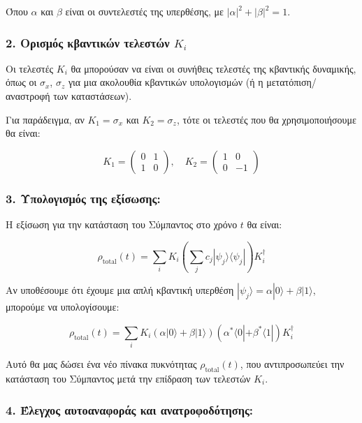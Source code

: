 \documentclass[a4paper,11pt]{article}
\begin{document}
Όπου {{\(\alpha\)}} και {{\(\beta\)}} είναι οι συντελεστές της
υπερθέσης, με {{\(|\alpha|^2 + |\beta|^2 = 1\)}}.

\subsubsection{2. Ορισμός κβαντικών τελεστών \( K_i \)}\label{ορισμός-κβαντικών-τελεστών-k_i}


Οι τελεστές {{\(K_i\)}} θα μπορούσαν να είναι οι συνήθεις τελεστές της
κβαντικής δυναμικής, όπως οι {{\(\sigma_x\)}}, {{\(\sigma_z\)}} για μια
ακολουθία κβαντικών υπολογισμών (ή η μετατόπιση/αναστροφή των
καταστάσεων).

Για παράδειγμα, αν {{\(K_1 = \sigma_x\)}} και {{\(K_2 = \sigma_z\)}},
τότε οι τελεστές που θα χρησιμοποιήσουμε θα είναι:

{{{\[K_1 = \begin{pmatrix} 0 & 1 \\ 1 & 0 \end{pmatrix}, \quad K_2 = \begin{pmatrix} 1 & 0 \\ 0 & -1 \end{pmatrix}\]}}}

\subsubsection{3. Υπολογισμός της
εξίσωσης:}\label{ux3c5ux3c0ux3bfux3bbux3bfux3b3ux3b9ux3c3ux3bcux3ccux3c2-ux3c4ux3b7ux3c2-ux3b5ux3beux3afux3c3ux3c9ux3c3ux3b7ux3c2}

Η εξίσωση για την κατάσταση του Σύμπαντος στο χρόνο {{\(t\)}} θα είναι:

{{{\[\rho_{\text{total}}(t) = \sum_{i} K_i \left( \sum_j c_j |\psi_j \rangle \langle \psi_j | \right) K_i^\dagger\]}}}

Αν υποθέσουμε ότι έχουμε μια απλή κβαντική υπερθέση
{{\(|\psi_j\rangle = \alpha |0\rangle + \beta |1\rangle\)}}, μπορούμε να
υπολογίσουμε:

{{{\[\rho_{\text{total}}
(t) = \sum_{i} K_i \left( \alpha |0\rangle + \beta |1\rangle \right) 
\left( \alpha^* \langle 0| + \beta^* \langle 1| \right) K_i^\dagger\]}}}

Αυτό θα μας δώσει ένα νέο πίνακα πυκνότητας
{{\(\rho_{\text{total}}(t)\)}}, που αντιπροσωπεύει την κατάσταση του
Σύμπαντος μετά την επίδραση των τελεστών {{\(K_i\)}}.

\subsubsection{4. Έλεγχος αυτοαναφοράς και
ανατροφοδότησης:}\label{ux3adux3bbux3b5ux3b3ux3c7ux3bfux3c2-ux3b1ux3c5ux3c4ux3bfux3b1ux3bdux3b1ux3c6ux3bfux3c1ux3acux3c2-ux3baux3b1ux3b9-ux3b1ux3bdux3b1ux3c4ux3c1ux3bfux3c6ux3bfux3b4ux3ccux3c4ux3b7ux3c3ux3b7ux3c2}
\end{document}
